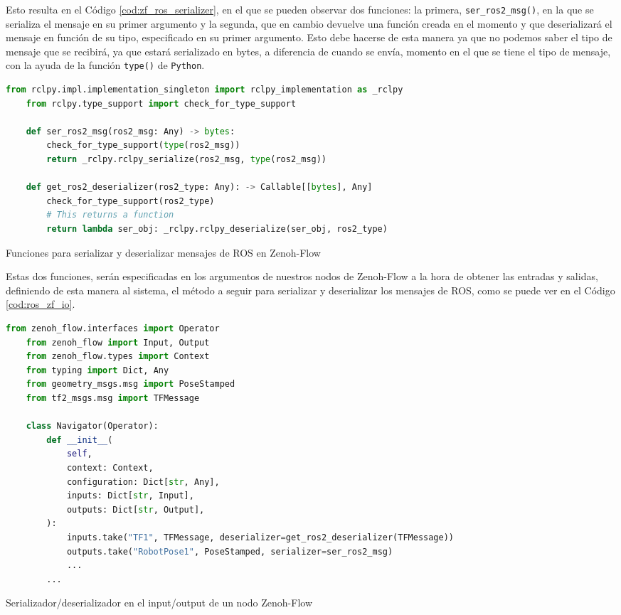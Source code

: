 Esto resulta en el Código \ref{cod:zf_ros_serializer}, en el que se pueden
observar dos funciones: la primera, \verb|ser_ros2_msg()|, en la que se
serializa el mensaje en su primer argumento y la segunda, que en cambio devuelve
una función creada en el momento y que deserializará el mensaje en función de su
tipo, especificado en su primer argumento.
Esto debe hacerse de esta manera ya que no podemos saber el tipo de mensaje que
se recibirá, ya que estará serializado en bytes, a diferencia de cuando se
envía, momento en el que se tiene el tipo de mensaje, con la ayuda de la función
\verb|type()| de \texttt{Python}.
\\

\begin{code}[h!]
  \begin{lstlisting}[language=Python]
    from rclpy.impl.implementation_singleton import rclpy_implementation as _rclpy
    from rclpy.type_support import check_for_type_support

    def ser_ros2_msg(ros2_msg: Any) -> bytes:
        check_for_type_support(type(ros2_msg))
        return _rclpy.rclpy_serialize(ros2_msg, type(ros2_msg))

    def get_ros2_deserializer(ros2_type: Any): -> Callable[[bytes], Any]
        check_for_type_support(ros2_type)
        # This returns a function
        return lambda ser_obj: _rclpy.rclpy_deserialize(ser_obj, ros2_type)
  \end{lstlisting}
\caption[Funciones para serializar y deserializar mensajes de ROS en Zenoh-Flow]{Funciones para serializar y deserializar mensajes de ROS en Zenoh-Flow}
\label{cod:zf_ros_serializer}
\end{code}

Estas dos funciones, serán especificadas en los argumentos de nuestros nodos de
Zenoh-Flow a la hora de obtener las entradas y salidas, definiendo de esta
manera al sistema, el método a seguir para serializar y deserializar los
mensajes de ROS, como se puede ver en el Código \ref{cod:ros_zf_io}.
\\

\begin{code}[h!]
  \begin{lstlisting}[language=Python]
    from zenoh_flow.interfaces import Operator
    from zenoh_flow import Input, Output
    from zenoh_flow.types import Context
    from typing import Dict, Any
    from geometry_msgs.msg import PoseStamped
    from tf2_msgs.msg import TFMessage

    class Navigator(Operator):
        def __init__(
            self,
            context: Context,
            configuration: Dict[str, Any],
            inputs: Dict[str, Input],
            outputs: Dict[str, Output],
        ):
            inputs.take("TF1", TFMessage, deserializer=get_ros2_deserializer(TFMessage))
            outputs.take("RobotPose1", PoseStamped, serializer=ser_ros2_msg)
            ...
        ...
  \end{lstlisting}
\caption[Serializador/deserializador en los input/output de un nodo Zenoh-Flow]{Serializador/deserializador en el input/output de un nodo Zenoh-Flow}
\label{cod:ros_zf_io}
\end{code}

